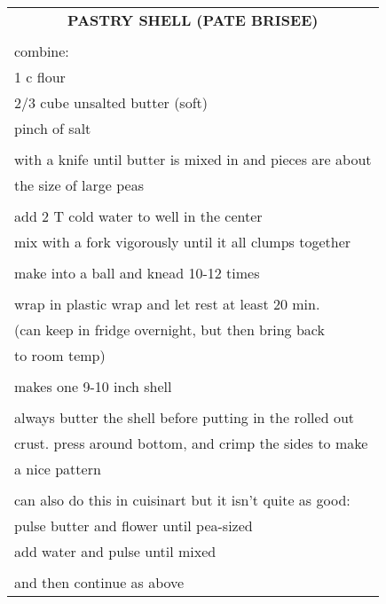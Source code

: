 \documentclass[8pt]{report}
\begin{document}
\begin{tabular}{|l|} \hline	%
 
\multicolumn{1}{|c|}{\textbf{PASTRY SHELL (PATE BRISEE)}}
\\
\\

\index{desserts!pastry shell (pate brisee)} \index{pastry shell}
\index{pate brisee}




combine:\\
\hspace{0.5 in}	1 c flour\\
\hspace{0.5 in}	2/3 cube unsalted butter (soft)\\
\hspace{0.5 in}	pinch of salt\\
\\
with a knife until butter is mixed in and pieces are about\\
the size of large peas\\
\\
add 2 T cold water to well in the center\\
mix with a fork vigorously until it all clumps together\\
\\
make into a ball and knead 10-12 times\\
\\
wrap in plastic wrap and let rest at least 20 min.\\
(can keep in fridge overnight, but then bring back\\
to room temp)\\
\\
makes one 9-10 inch shell\\
\\
always butter the shell before putting in the rolled out \\
crust.  press around bottom, and crimp the sides to make\\
a nice pattern\\
\\
can also do this in cuisinart but it isn't quite as good:\\
\hspace{0.5 in}	pulse butter and flower until pea-sized\\
\hspace{0.5 in}	add water and pulse until mixed\\
\\
and then continue as above\\



\hline

\end{tabular}
\end{document}
